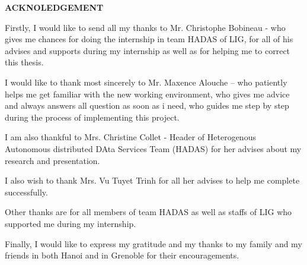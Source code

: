 {\scshape\Large\bfseries\centering ACKNOLEDGEMENT \par}
\vspace{1cm}
\begin{flushleft}

{\justify
{Firstly, I would like to send all my thanks to Mr. Christophe Bobineau - who gives me chances for doing the internship in team HADAS of LIG, for all of his advises and supports during my internship as well as for helping me to correct this thesis.\par }
\vspace{0.5cm}
{\justify 
I would like to thank most sincerely to Mr. Maxence Alouche – who patiently helps me get familiar with the new working environment, who gives me advice and always answers all question as soon as i need, who guides me step by step during the process of implementing this project.\par }
\vspace{0.5cm}
{\justify 
I am also thankful to Mrs. Christine Collet - Header of Heterogenous Autonomous distributed DAta Services Team (HADAS) for her advises about my research and presentation. \par }
\vspace{0.5cm}
{\justify 
I also wish to thank Mrs. Vu Tuyet Trinh for all her advises to help me complete successfully. \par}
\vspace{0.5cm}
{\justify Other thanks are for all members of team HADAS as well as staffs of LIG who supported me during my internship. \par}
\vspace{0.5cm}
{\justify 
Finally, I would like to express my gratitude and my thanks to my family and my friends in both Hanoi and in Grenoble for their encouragements. \par }

}\end{flushleft}